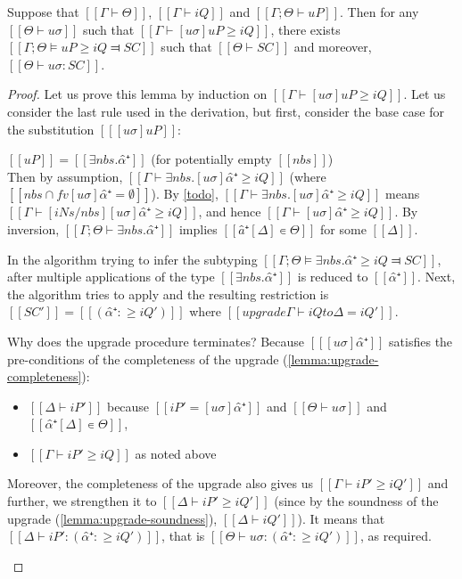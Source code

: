 \begin{lemma} \label{lemma:pos-subt-completeness}
    Suppose that $[[Γ ⊢ Θ]]$, $[[Γ ⊢ iQ]]$ and $[[Γ ; Θ ⊢ uP]]$.
    Then for any $[[Θ ⊢ uσ]]$ such that $[[ Γ ⊢ [uσ]uP ≥ iQ ]]$,
    there exists $[[Γ; Θ ⊨ uP ≥ iQ ⫤ SC]]$ such that $[[Θ ⊢ SC]]$ and moreover, $[[Θ ⊢ uσ : SC]]$.
\end{lemma}
\begin{proof}
    Let us prove this lemma by induction on $[[ Γ ⊢ [uσ]uP ≥ iQ ]]$.
    Let us consider the last rule used in the derivation,
    but first, consider the base case for the substitution $[[ [uσ]uP ]]$:
    \begin{caseof}
        \item \label{case:pos-subt-complete-base} $[[uP]] = [[ ∃nbs.α̂⁺ ]]$ (for potentially empty $[[nbs]]$)\\
        Then by assumption, $[[ Γ ⊢ ∃nbs.[uσ]α̂⁺ ≥ iQ ]]$ (where $[[ {nbs} ∩ fv [uσ]α̂⁺ = ∅]]$).
        By \cref{todo}, $[[ Γ ⊢ ∃nbs.[uσ]α̂⁺ ≥ iQ ]]$ means 
        $[[ Γ ⊢ [iNs/nbs][uσ]α̂⁺ ≥ iQ ]]$, and hence $[[ Γ ⊢ [uσ]α̂⁺ ≥ iQ ]]$.
        By inversion, $[[Γ ; Θ ⊢ ∃nbs.α̂⁺]]$ implies $[[â⁺[Δ] ∊ Θ]]$ for some $[[Δ]]$.

        In the algorithm trying to infer the subtyping 
        $[[Γ; Θ ⊨ ∃nbs.α̂⁺ ≥ iQ ⫤ SC]]$,
        after multiple applications of 
        the type $[[∃nbs.α̂⁺]]$ is reduced to $[[α̂⁺]]$.
        Next, the algorithm tries to apply
        and the resulting restriction is $[[SC']] = [[(α̂⁺ :≥ iQ')]]$ where
        $[[upgrade Γ ⊢ iQ to Δ = iQ']]$.

        Why does the upgrade procedure terminates?
        Because $[[ [uσ]α̂⁺ ]]$ satisfies the pre-conditions of the completeness of the upgrade
        (\cref{lemma:upgrade-completeness}):
        \begin{itemize}
            \item $[[Δ ⊢ iP']]$ because $[[iP' = [uσ]α̂⁺]]$ and $[[Θ ⊢ uσ]]$ and 
            $[[α̂⁺[Δ] ∊ Θ]]$,
            \item $[[Γ ⊢ iP' ≥ iQ]]$ as noted above
        \end{itemize}
        Moreover, the completeness of the upgrade also gives us $[[Γ ⊢ iP' ≥ iQ']]$
        and further, we strengthen it to $[[Δ ⊢ iP' ≥ iQ']]$
        (since by the soundness of the upgrade (\cref{lemma:upgrade-soundness}),
        $[[Δ ⊢ iQ']]$).  It means that $[[Δ ⊢ iP' : (α̂⁺ :≥ iQ') ]]$, that is 
        $[[Θ ⊢ uσ : (α̂⁺ :≥ iQ') ]]$, as required.


\end{caseof}
\end{proof}
